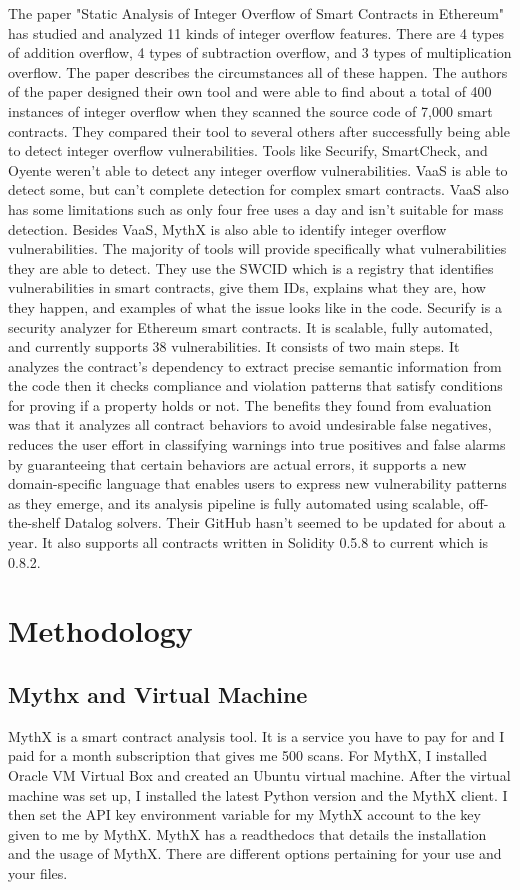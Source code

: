 \documentclass{article}
\begin{document}
The paper "Static Analysis of Integer Overflow of Smart Contracts in Ethereum" \cite{Static} has studied and analyzed 11 kinds of integer overflow features. There are 4 types of addition overflow, 4 types of subtraction overflow, and 3 types of multiplication overflow. The paper describes the circumstances all of these happen. The authors of the paper designed their own tool and were able to find about a total of 400 instances of integer overflow when they scanned the source code of 7,000 smart contracts. They compared their tool to several others after successfully being able to detect integer overflow vulnerabilities. Tools like Securify, SmartCheck, and Oyente weren't able to detect any integer overflow vulnerabilities. VaaS is able to detect some, but can't complete detection for complex smart contracts. VaaS also has some limitations such as only four free uses a day and isn't suitable for mass detection. Besides VaaS, MythX is also able to identify integer overflow vulnerabilities. The majority of tools will provide specifically what vulnerabilities they are able to detect. They use the SWCID \cite{SWCReg} which is a registry that identifies vulnerabilities in smart contracts, give them IDs, explains what they are, how they happen, and examples of what the issue looks like in the code. Securify \cite{Securify} is a security analyzer for Ethereum smart contracts. It is scalable, fully automated, and currently supports 38 vulnerabilities.  It consists of two main steps. It analyzes the contract's dependency to extract precise semantic information from the code then it checks compliance and violation patterns that satisfy conditions for proving if a property holds or not. The benefits they found from evaluation was that it analyzes all contract behaviors to avoid undesirable false negatives, reduces the user effort in classifying warnings into true positives and false alarms by guaranteeing that certain behaviors are actual errors, it supports a new domain-specific language that enables users to express new vulnerability patterns as they emerge, and its analysis pipeline is fully automated using scalable, off-the-shelf Datalog solvers. Their GitHub hasn't seemed to be updated for about a year. It also supports all contracts written in Solidity 0.5.8 to current which is 0.8.2.

\section{Methodology}

\subsection{Mythx and Virtual Machine}
MythX is a smart contract analysis tool. It is a service you have to pay for and I paid for a month subscription that gives me 500 scans. For MythX, I installed Oracle VM Virtual Box and created an Ubuntu virtual machine. After the virtual machine was set up, I installed the latest Python version and the MythX client. I then set the API key environment variable for my MythX account to the key given to me by MythX. MythX has a readthedocs \cite{MythXClientDocumentation} that details the installation and the usage of MythX. There are different options pertaining for your use and your files.
\end{document}
